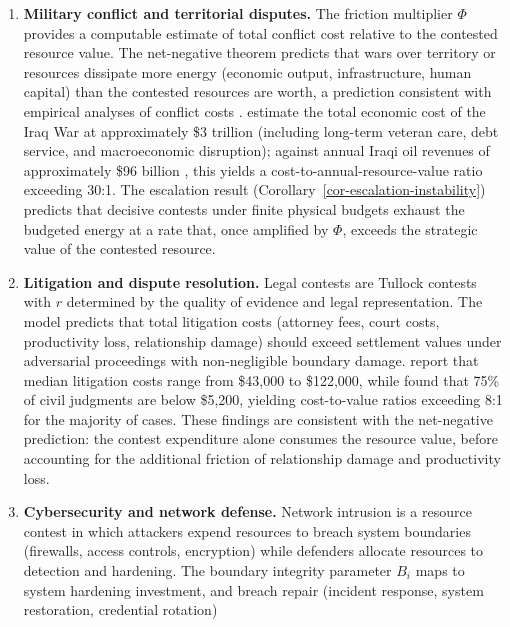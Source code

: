 \documentclass[11pt]{article}
\theoremstyle{plain}
\theoremstyle{definition}
\theoremstyle{remark}
\begin{document}
\begin{enumerate}
\def\labelenumi{\arabic{enumi}.}
\item
  \textbf{Military conflict and territorial disputes.} The friction
  multiplier \(\Phi\) provides a computable estimate of total conflict
  cost relative to the contested resource value. The net-negative
  theorem predicts that wars over territory or resources dissipate more
  energy (economic output, infrastructure, human capital) than the
  contested resources are worth, a prediction consistent with empirical
  analyses of conflict costs \citep{GarfinkelSkaperdas2012}.
  \citet{StiglitzBilmes2008} estimate the total economic cost of the
  Iraq War at approximately \$3 trillion (including long-term veteran
  care, debt service, and macroeconomic disruption); against annual
  Iraqi oil revenues of approximately \$96 billion \citep{IMF2024Iraq},
  this yields a cost-to-annual-resource-value ratio exceeding 30:1. The
  escalation result (Corollary~\ref{cor-escalation-instability})
  predicts that decisive contests under finite physical budgets exhaust
  the budgeted energy at a rate that, once amplified by \(\Phi\),
  exceeds the strategic value of the contested resource.
\item
  \textbf{Litigation and dispute resolution.} Legal contests are Tullock
  contests with \(r\) determined by the quality of evidence and legal
  representation. The model predicts that total litigation costs
  (attorney fees, court costs, productivity loss, relationship damage)
  should exceed settlement values under adversarial proceedings with
  non-negligible boundary damage. \citet{HannafordAgor2013} report that
  median litigation costs range from \$43,000 to \$122,000, while
  \citet{HannafordAgor2015} found that 75\% of civil judgments are below
  \$5,200, yielding cost-to-value ratios exceeding 8:1 for the majority
  of cases. These findings are consistent with the net-negative
  prediction: the contest expenditure alone consumes the resource value,
  before accounting for the additional friction of relationship damage
  and productivity loss.
\item
  \textbf{Cybersecurity and network defense.} Network intrusion is a
  resource contest in which attackers expend resources to breach system
  boundaries (firewalls, access controls, encryption) while defenders
  allocate resources to detection and hardening. The boundary integrity
  parameter \(B_i\) maps to system hardening investment, and breach
  repair (incident response, system restoration, credential rotation)

\end{enumerate}
\end{document}
